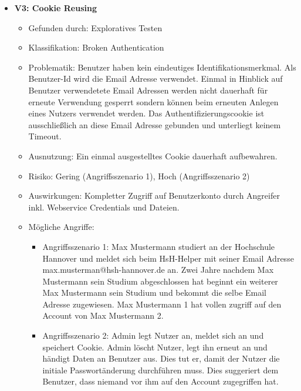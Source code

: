 \documentclass[12pt,DIV14,BCOR10mm,a4paper,parskip=half-,headsepline,headinclude,english,ngerman,bibliography=totocnumbered]{scrreprt}
\begin{document}
\begin{itemize}
  \hypertarget{vulnerability3}{}
  \item \textbf{V3: Cookie Reusing}
  \begin{itemize}
  \item Gefunden durch: Exploratives Testen
  \item Klassifikation: Broken Authentication
  \item Problematik: Benutzer haben kein eindeutiges Identifikationsmerkmal. Als Benutzer-Id wird die Email Adresse verwendet. Einmal in Hinblick auf Benutzer verwendetete Email Adressen werden nicht dauerhaft für erneute Verwendung gesperrt sondern können beim erneuten Anlegen eines Nutzers verwendet werden. Das Authentifizierungscookie ist ausschließlich an diese Email Adresse gebunden und unterliegt keinem Timeout.
  \item Ausnutzung: Ein einmal ausgestelltes Cookie dauerhaft aufbewahren.
  \item Risiko: Gering (Angriffsszenario 1), Hoch (Angriffsszenario 2)
  \item Auswirkungen: Kompletter Zugriff auf Benutzerkonto durch Angreifer inkl. Webservice Credentials und Dateien.
  \item Mögliche Angriffe:
  	\begin{itemize}
  		\item Angriffsszenario 1: Max Mustermann studiert an der Hochschule Hannover und meldet sich beim HsH-Helper mit seiner Email Adresse max.musterman@hsh-hannover.de an. Zwei Jahre nachdem Max Mustermann sein Studium abgeschlossen hat beginnt ein weiterer Max Mustermann sein Studium und bekommt die selbe Email Adresse zugewiesen. Max Mustermann 1 hat vollen zugriff auf den Account von Max Mustermann 2.
  		\item Angriffsszenario 2: Admin legt Nutzer an, meldet sich an und speichert Cookie. Admin löscht Nutzer, legt ihn erneut an und händigt Daten an Benutzer aus. Dies tut er, damit der Nutzer die initiale Passwortänderung durchführen muss. Dies suggeriert dem Benutzer, dass niemand vor ihm auf den Account zugegriffen hat.
  	\end{itemize}

  \end{itemize}


\end{itemize}
\end{document}
